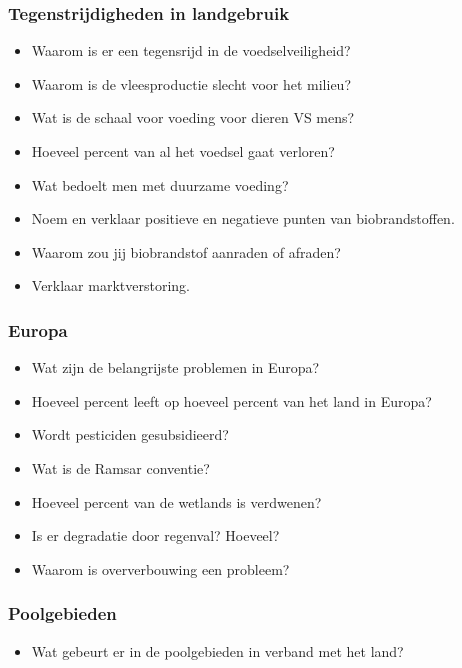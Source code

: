 \documentclass[12pt]{article}
\begin{document}
    \subsubsection*{Tegenstrijdigheden in landgebruik}
    \begin{itemize}
        \item Waarom is er een tegensrijd in de voedselveiligheid?
        \item Waarom is de vleesproductie slecht voor het milieu?
        \item Wat is de schaal voor voeding voor dieren VS mens?
        \item Hoeveel percent van al het voedsel gaat verloren?
        \item Wat bedoelt men met duurzame voeding?
        \item Noem en verklaar positieve en negatieve punten van biobrandstoffen.
        \item Waarom zou jij biobrandstof aanraden of afraden?
        \item Verklaar marktverstoring.
    \end{itemize}

    \subsubsection*{Europa}
    \begin{itemize}
        \item Wat zijn de belangrijste problemen in Europa?
        \item Hoeveel percent leeft op hoeveel percent van het land in Europa?
        \item Wordt pesticiden gesubsidieerd?
        \item Wat is de Ramsar conventie?
        \item Hoeveel percent van de wetlands is verdwenen?
        \item Is er degradatie door regenval? Hoeveel?
        \item Waarom is oververbouwing een probleem?
    \end{itemize}

    \subsubsection*{Poolgebieden}
    \begin{itemize}
        \item Wat gebeurt er in de poolgebieden in verband met het land?
    \end{itemize}
\end{document}
